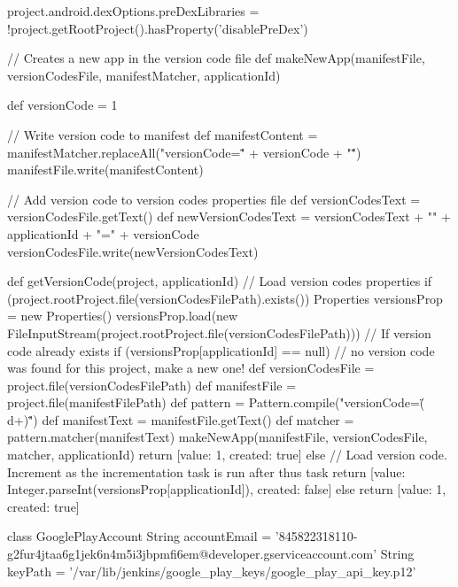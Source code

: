 \begin{gradlecode}[caption=Gradle Plugin to help publish APKs,label=lst:gradle_plugin_publish]
{{        project.android.dexOptions.preDexLibraries = !project.getRootProject().hasProperty('disablePreDex')
    }

    // Creates a new app in the version code file
    def makeNewApp(manifestFile, versionCodesFile, manifestMatcher, applicationId) {
        def versionCode = 1

        // Write version code to manifest
        def manifestContent = manifestMatcher.replaceAll("versionCode=\"" + versionCode + "\"")
        manifestFile.write(manifestContent)

        // Add version code to version codes properties file
        def versionCodesText = versionCodesFile.getText()
        def newVersionCodesText = versionCodesText + "\n" + applicationId + "=" + versionCode
        versionCodesFile.write(newVersionCodesText)
    }

    def getVersionCode(project, applicationId) {
        // Load version codes properties
        if (project.rootProject.file(versionCodesFilePath).exists()) {
            Properties versionsProp = new Properties()
            versionsProp.load(new FileInputStream(project.rootProject.file(versionCodesFilePath)))
            // If version code already exists
            if (versionsProp[applicationId] == null) {
                // no version code was found for this project, make a new one!
                def versionCodesFile = project.file(versionCodesFilePath)
                def manifestFile = project.file(manifestFilePath)
                def pattern = Pattern.compile("versionCode=\"(\\d+)\"")
                def manifestText = manifestFile.getText()
                def matcher = pattern.matcher(manifestText)
                makeNewApp(manifestFile, versionCodesFile, matcher, applicationId)
                return [value: 1, created: true]
            } else {
                // Load version code. Increment as the incrementation task is run after thus task
                return [value: Integer.parseInt(versionsProp[applicationId]), created: false]
            }
        }
        else {
            return [value: 1, created: true]
        }
    }
}

class GooglePlayAccount {
    String accountEmail = '845822318110-g2fur4jtaa6g1jek6n4m5i3jbpmfi6em@developer.gserviceaccount.com'
    String keyPath = '/var/lib/jenkins/google_play_keys/google_play_api_key.p12'
}
\end{gradlecode}

